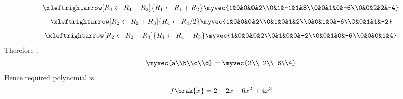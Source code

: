 \documentclass[journal,12pt,twocolumn]{IEEEtran}
\begin{document}
\begin{align}
\xleftrightarrow[R_4\leftarrow R_4-R_2]{R_1\leftarrow R_1+R_2}
\myvec{1&0&0&0&2\\0&1&-1&1&8\\0&0&1&0&-6\\0&0&2&2&-4}
\end{align}
\begin{align}
\xleftrightarrow[R_2\leftarrow R_2+R_3]{R_4\leftarrow R_4/2}
\myvec{1&0&0&0&2\\0&1&0&1&2\\0&0&1&0&-6\\0&0&1&1&-2}
\end{align}
\begin{align}
\xleftrightarrow[R_2\leftarrow R_2-R_4]{R_4\leftarrow R_4-R_3}
\myvec{1&0&0&0&2\\0&1&0&0&-2\\0&0&1&0&-6\\0&0&0&1&4}
\end{align}
Therefore ,
\begin{align}
    \myvec{a\\b\\c\\d}=\myvec{2\\-2\\-6\\4}
\end{align}
Hence required polynomial is
\begin{align}
f\brak{x}=2-2x-6x^{2}+4x^{3}    
\end{align}
\end{document}
